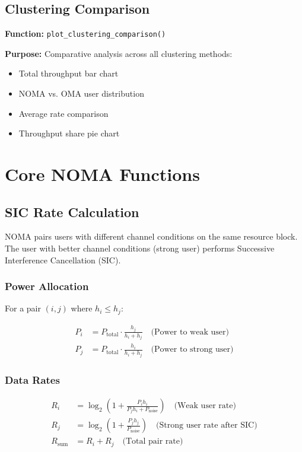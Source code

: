 \documentclass[12pt,a4paper]{article}
\newcommand{\code}[1]{\texttt{#1}}
\begin{document}
\subsection{Clustering Comparison}

\textbf{Function:} \code{plot\_clustering\_comparison()}

\textbf{Purpose:} Comparative analysis across all clustering methods:
\begin{itemize}
    \item Total throughput bar chart
    \item NOMA vs. OMA user distribution
    \item Average rate comparison
    \item Throughput share pie chart
\end{itemize}

\section{Core NOMA Functions}

\subsection{SIC Rate Calculation}

NOMA pairs users with different channel conditions on the same resource block. The user with better channel conditions (strong user) performs Successive Interference Cancellation (SIC).

\subsubsection{Power Allocation}

For a pair $(i,j)$ where $h_i \leq h_j$:

\begin{align}
P_i &= P_{\text{total}} \cdot \frac{h_j}{h_i + h_j} \quad \text{(Power to weak user)} \\
P_j &= P_{\text{total}} \cdot \frac{h_i}{h_i + h_j} \quad \text{(Power to strong user)}
\end{align}

\subsubsection{Data Rates}

\begin{align}
R_i &= \log_2\left(1 + \frac{P_i h_i}{P_j h_i + P_{\text{noise}}}\right) \quad \text{(Weak user rate)} \\
R_j &= \log_2\left(1 + \frac{P_j h_j}{P_{\text{noise}}}\right) \quad \text{(Strong user rate after SIC)} \\
R_{\text{sum}} &= R_i + R_j \quad \text{(Total pair rate)}
\end{align}
\end{document}
